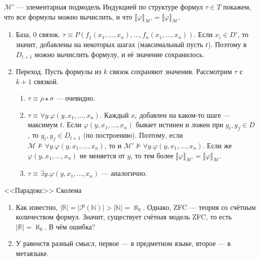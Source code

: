 \documentclass[aspectratio=169]{beamer}
\begin{document}
\begin{frame}{$\mathcal{M}'$ --- элементарная подмодель}
Индукцией по структуре формул $\tau \in T$ покажем, 
что все формулы можно вычислить, и что $\llbracket \varphi \rrbracket_\mathcal{M'} = \llbracket \varphi \rrbracket_\mathcal{M}$.\pause

\begin{enumerate}
\item База, 0 связок. $\tau \equiv P(f_1(x_1,\dots,x_n),\dots,f_n(x_1,\dots,x_n))$. \pause Если $x_i \in D'$, то значит,
добавлены на некоторых шагах (максимальный пусть $t$). Поэтому в $D_{t+1}$ можно вычислить формулу, и её значение сохранилось. \pause
\item Переход. Пусть формулы из $k$ связок сохраняют значения. Рассмотрим $\tau$ с $k+1$ связкой. \pause
\begin{enumerate}
\item $\tau \equiv \rho \star \sigma$ --- очевидно. \pause
\item $\tau\equiv\forall y.\varphi(y,x_1,\dots,x_n)$. \pause 
Каждый $x_i$ добавлен на каком-то шаге --- максимум $t$. \pause 
Если $\varphi(y,x_1,\dots,x_n)$ бывает истинен и ложен при $y_t, y_f \in D$, то $y_t, y_f \in D_{t+1}$ (по построению). \pause
Поэтому, если $\mathcal{M}\not\models\forall y.\varphi(y,x_1,\dots,x_n)$, то и 
$\mathcal{M'}\not\models\forall y.\varphi(y,x_1,\dots,x_n)$. \pause
Если же $\varphi(y,x_1,\dots,x_n)$ не меняется от $y$, то тем более
$\llbracket \varphi \rrbracket_\mathcal{M'} = \llbracket \varphi \rrbracket_\mathcal{M}$. \pause
\item $\tau\equiv\exists y.\varphi(y,x_1,\dots,x_n)$ --- аналогично.
\end{enumerate}
\end{enumerate}
\end{frame}

\begin{frame}{<<Парадокс>> Сколема}
\begin{enumerate}
\item Как известно, $|\mathbb{R}| = |\mathcal{P}(\mathbb{N})| > |\mathbb{N}| = \aleph_0$. \pause Однако, ZFC --- теория со счётным
количеством формул. \pause
Значит, существует счётная модель ZFC, то есть $|\mathbb{R}| = \aleph_0$. \pause В чём ошибка? \pause
\item У равенств разный смысл, первое --- в предметном языке, второе --- в метаязыке. 
\end{enumerate}
\end{frame}
\end{document}
